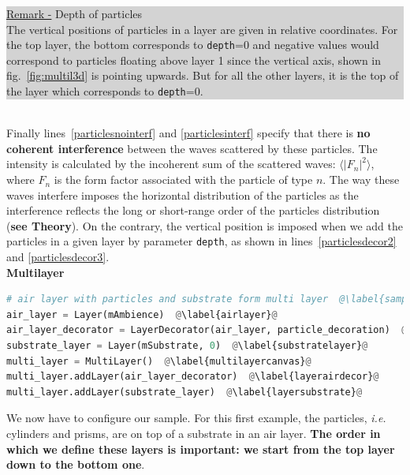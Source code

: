 \noindent {\huge\danger} 
\colorbox{Lightgray}{\parbox{\dimexpr\linewidth-8\fboxsep}
{\underline{Remark -} Depth of particles\\
The vertical positions of particles in a layer are given in relative
coordinates. For the top layer, the bottom corresponds to
\texttt{depth}=0 and negative values would correspond to particles
floating above layer 1 since the vertical axis, shown in
fig.~\ref{fig:multil3d} is pointing upwards. But for all the other layers, it is the top of the
layer which corresponds to \texttt{depth}=0.}}\\


\noindent Finally lines~\ref{particlesnointerf} and
\ref{particlesinterf} specify that there is \textbf{no coherent interference} between
the waves scattered by these particles. The intensity is calculated by
the incoherent sum of the scattered waves: $\langle |F_n|^2\rangle$,
where $F_n$ is the form factor associated with the particle of type $n$.  The way these waves
interfere imposes the horizontal distribution of
the particles as
the interference reflects the long or short-range order of the
particles distribution (\textbf{see Theory}). On the contrary, the vertical position is
imposed when we add the particles in a given layer by parameter \texttt{depth}, as shown in lines~\ref{particlesdecor2} and \ref{particlesdecor3}. \\

\noindent \textbf{Multilayer}\\

\begin{lstlisting}[language=python, style=eclipseboxed,name=ex1,nolol]
# air layer with particles and substrate form multi layer  @\label{sampleassembling}@
air_layer = Layer(mAmbience)  @\label{airlayer}@
air_layer_decorator = LayerDecorator(air_layer, particle_decoration)  @\label{airlayerdecorator}@
substrate_layer = Layer(mSubstrate, 0)  @\label{substratelayer}@
multi_layer = MultiLayer()  @\label{multilayercanvas}@
multi_layer.addLayer(air_layer_decorator)  @\label{layerairdecor}@
multi_layer.addLayer(substrate_layer)  @\label{layersubstrate}@
\end{lstlisting}

\noindent We now have to configure our sample. For this first example,
the particles, \textit{i.e.} cylinders and prisms, are on top of a substrate in an
air layer. \textbf{The order in which we define these layers is important: we
start from the top layer down to the bottom one}.\\

